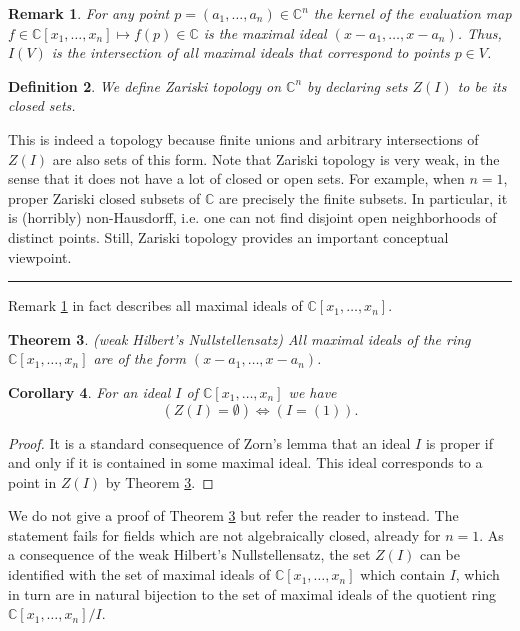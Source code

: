 \documentclass[11pt]{article}
\numberwithin{equation}{section}
\numberwithin{footnote}{section}
\newtheorem{thm}{Theorem}[section]
\newtheorem{cor}[thm]{Corollary}
\newtheorem{defn}[thm]{Definition}
\newtheorem{rem}[thm]{Remark}
\newcommand{\blue}{\color{blue}}
\newcommand{\C}{{\mathbb C}}
\begin{document}
\begin{rem}\label{maxpts}
For any 
point $p=(a_1,\ldots,a_n)\in \C^n$ the kernel of the evaluation map $f\in \C[x_1,\ldots,x_n]\mapsto f(p)\in \C$ is the maximal ideal
$(x-a_1,\ldots,x-a_n)$. Thus, $I(V)$ is the intersection of all maximal ideals that correspond to points $p\in V$.
\end{rem}


\smallskip\smallskip
\begin{defn}
We define {\blue Zariski topology} on $\C^n$ by declaring sets $Z(I)$  to be its closed sets.
\end{defn}

This is indeed a topology because finite unions and arbitrary intersections of $Z(I)$ are also sets of this form. Note that Zariski topology is very weak, in the sense that it does not have a lot of closed or open sets. For example, when $n=1$, proper Zariski closed subsets of $\C$ are precisely the finite subsets. In particular, it is (horribly) non-Hausdorff, i.e. one can not find disjoint open neighborhoods of distinct points. Still, Zariski topology provides an important conceptual viewpoint. 

\smallskip
{\blue \hrule}

\smallskip
Remark \ref{maxpts} in fact describes all maximal ideals of  $\C[x_1,\ldots,x_n]$.

\smallskip
\begin{thm}\label{whn}(weak Hilbert's Nullstellensatz)
All maximal ideals of the ring $\C[x_1,\ldots,x_n]$ are of the form $(x-a_1,\ldots,x-a_n)$.
\end{thm}

\smallskip
\begin{cor}\label{corwhn}
For an ideal $I$ of $\C[x_1,\ldots,x_n]$ we have 
$$
(Z(I)=\emptyset) \iff  (I = (1)).
$$
\end{cor}

\begin{proof}
It is a standard consequence of Zorn's lemma that an ideal $I$ is proper if and only if it is contained in some maximal ideal. This ideal corresponds to a point in $Z(I)$ by Theorem \ref{whn}.\end{proof}

We do not give a proof of Theorem \ref{whn} but refer the reader to \cite{DF} instead. The statement fails for fields which are not algebraically closed, already for $n=1$.
As a consequence of the weak Hilbert's Nullstellensatz, the set $Z(I)$ can be identified with the set of maximal ideals of $\C[x_1,\ldots,x_n]$ which contain $I$, which in turn are in natural bijection to the set of maximal ideals of the quotient ring $\C[x_1,\ldots,x_n]/I$.
\end{document}
